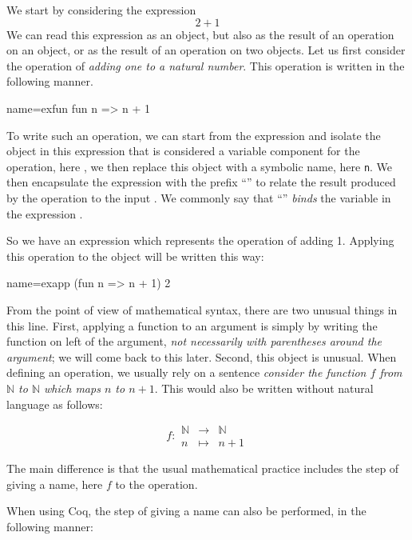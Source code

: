 We start by considering the expression
\[ 2 + 1 \]
We can read this expression as an object, but also as the result of an
operation on an object, or as the result of an operation on two
objects.  Let us first consider the operation of {\em adding one to
a natural number}.  This operation is written in the following manner.

\begin{coq}{name=exfun}{}
  fun n => n + 1
\end{coq}
To write such an operation, we can start from the expression 
and isolate the object in this expression that is considered a
variable component for the operation, here , we then replace
this object with a symbolic name, here {\tt n}.  We then encapsulate
the expression  with the prefix ``'' to relate
the result produced by the operation to the input .  We commonly
say that ``'' \emph{binds} the variable  in the expression
.

So we have an expression which represents the operation of adding 1.
Applying this operation to the object  will be written this
way:

\begin{coq}{name=exapp}{}
  (fun n => n + 1) 2
\end{coq}
From the point of view of mathematical syntax, there are two unusual 
things in this line.  First, applying a function to an argument is simply
by writing the function on left of the argument, {\em not necessarily
with parentheses around the argument}; we will come back to this later.
Second, this object  is unusual.  
When defining an operation, we usually
rely on a sentence {\em consider the function \(f\) from {\(\mathbb{N}\)}
to {\(\mathbb{N}\)} which maps \(n\) to \(n + 1\)}.  This would also be
written without natural language as follows:

\begin{equation}\label{equation:f}
f : 
\begin{array}{ccc}
{\mathbb{N}} &\rightarrow& {\mathbb{N}}\\
n &\mapsto& n + 1
\end{array}
\end{equation}

The main difference is that the usual mathematical practice includes
the step of giving a name, here \(f\) to the operation.

When using Coq, the step of giving a name can also be
performed, in the following manner:

